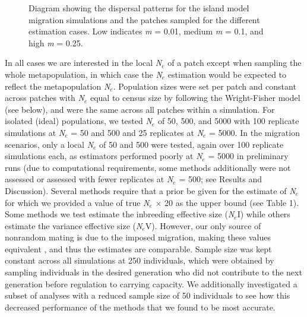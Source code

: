 \begin{figure}[]
\centering
{}
\caption{Diagram showing the dispersal patterns for the island model migration simulations and the patches 
sampled for the different estimation cases. Low indicates \emph{m} = 0.01, medium \emph{m} = 0.1, and high \emph{m} = 0.25.}
\label{fig:ne-1}
\end{figure}

In all cases we are interested in the local \emph{N}$_e$ of a patch except when sampling 
the whole metapopulation, in which case the \emph{N}$_e$ estimation would be expected to 
reflect the metapopulation \emph{N}$_e$. Population sizes were set per patch and constant 
across patches with \emph{N}$_e$ equal to census size by following the Wright-Fisher model 
(see below), and were the same across all patches within a simulation. For isolated (ideal) 
populations, we tested \emph{N}$_e$ of 50, 500, and 5000 with 100 replicate simulations at 
\emph{N}$_e$ = 50 and 500 and 25 replicates at \emph{N}$_e$ = 5000. In the migration scenarios, 
only a local \emph{N}$_e$ of 50 and 500 were tested, again over 100 replicate simulations each, 
as estimators performed poorly at \emph{N}$_e$ = 5000 in preliminary runs (due to computational 
requirements, some methods additionally were not assessed or assessed with fewer replicates at 
\emph{N}$_e$ = 500; see Results and Discussion). Several methods require that a prior be given 
for the estimate of \emph{N}$_e$ for which we provided a value of true \emph{N}$_e$ $\times$ 20 as 
the upper bound (see Table 1). Some methods we test estimate the inbreeding effective size 
(\emph{N}$_e$I) while others estimate the variance effective size (\emph{N}$_e$V). However, 
our only source of nonrandom mating is due to the imposed migration, making these values 
equivalent \citep{Hill:1979}, and thus the estimates are comparable. Sample size was kept constant 
across all simulations at 250 individuals, which were obtained by sampling individuals in the 
desired generation who did not contribute to the next generation before regulation to carrying 
capacity. We additionally investigated a subset of analyses with a reduced sample size of 50 
individuals to see how this decreased performance of the methods that we found to be most accurate.

